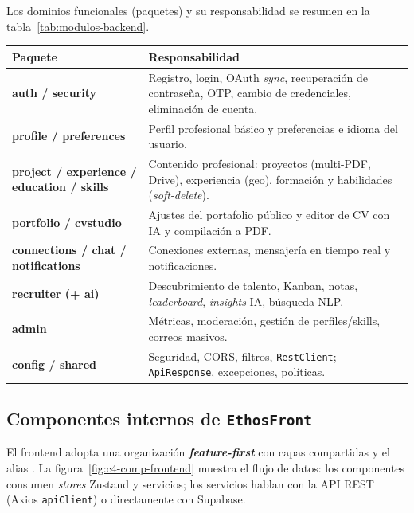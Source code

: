 Los dominios funcionales (paquetes) y su responsabilidad se resumen en la
tabla~\ref{tab:modulos-backend}.

\clearpage
\vspace{0.2cm}
\noindent
\renewcommand{\arraystretch}{1.3}
\fontsize{8.5}{10.2}\selectfont\sffamily
\begin{tabularx}{\textwidth}{|>{\ttfamily\bfseries\color{colorPrimario}}l|X|}
\hline
\rowcolor{headerTabla}
\textbf{Paquete} & \textbf{Responsabilidad} \\
\hline
auth / security & Registro, login, OAuth \textit{sync}, recuperación de contraseña, OTP, cambio de credenciales, eliminación de cuenta. \\
\hline
\rowcolor{grisTecnico}
profile / preferences & Perfil profesional básico y preferencias e idioma del usuario. \\
\hline
project / experience / education / skills & Contenido profesional: proyectos (multi-PDF, Drive), experiencia (geo), formación y habilidades (\textit{soft-delete}). \\
\hline
\rowcolor{grisTecnico}
portfolio / cvstudio & Ajustes del portafolio público y editor de CV con IA y compilación a PDF. \\
\hline
connections / chat / notifications & Conexiones externas, mensajería en tiempo real y notificaciones. \\
\hline
\rowcolor{grisTecnico}
recruiter (+ ai) & Descubrimiento de talento, Kanban, notas, \textit{leaderboard}, \textit{insights} IA, búsqueda NLP. \\
\hline
admin & Métricas, moderación, gestión de perfiles/skills, correos masivos. \\
\hline
\rowcolor{grisTecnico}
config / shared & Seguridad, CORS, filtros, \texttt{RestClient}; \texttt{ApiResponse}, excepciones, políticas. \\
\hline
\end{tabularx}
\label{tab:modulos-backend}

\subsection{Componentes internos de \texttt{EthosFront}}
\label{subsec:comp_frontend}

El frontend adopta una organización \textbf{\textit{feature-first}} con capas
compartidas y el alias . La
figura~\ref{fig:c4-comp-frontend} muestra el flujo de datos: los componentes consumen
\textit{stores} Zustand y servicios; los servicios hablan con la API REST (Axios
\texttt{apiClient}) o directamente con Supabase.

